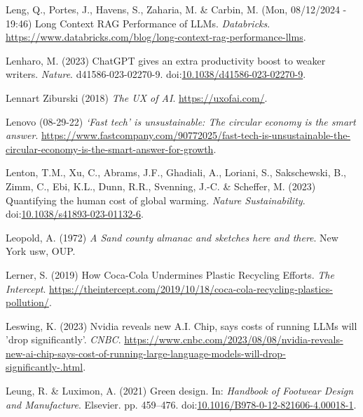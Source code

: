 \documentclass[
  letterpaper,
  DIV=11,
  numbers=noendperiod]{scrartcl}
\newlength{\cslhangindent}
\newenvironment{CSLReferences}[2] %
 {\begin{list}{}{%
  \setlength{\itemindent}{0pt}
  \setlength{\leftmargin}{0pt}
  \setlength{\parsep}{0pt}
  \ifodd #1
   \setlength{\leftmargin}{\cslhangindent}
   \setlength{\itemindent}{-1\cslhangindent}
  \fi
  \setlength{\itemsep}{#2\baselineskip}}}
 {\end{list}}
\begin{document}
\begin{CSLReferences}{0}{1}
Leng, Q., Portes, J., Havens, S., Zaharia, M. \& Carbin, M. (Mon,
08/12/2024 - 19:46) Long {Context RAG Performance} of {LLMs}.
\emph{Databricks}.
\url{https://www.databricks.com/blog/long-context-rag-performance-llms}.

Lenharo, M. (2023) {ChatGPT} gives an extra productivity boost to weaker
writers. \emph{Nature}. d41586-023-02270-9.
doi:\href{https://doi.org/10.1038/d41586-023-02270-9}{10.1038/d41586-023-02270-9}.

Lennart Ziburski (2018) \emph{The {UX} of {AI}}.
\url{https://uxofai.com/}.

Lenovo (08-29-22) \emph{{`{Fast} tech'} is unsustainable: {The} circular
economy is the smart answer}.
\url{https://www.fastcompany.com/90772025/fast-tech-is-unsustainable-the-circular-economy-is-the-smart-answer-for-growth}.

Lenton, T.M., Xu, C., Abrams, J.F., Ghadiali, A., Loriani, S.,
Sakschewski, B., Zimm, C., Ebi, K.L., Dunn, R.R., Svenning, J.-C. \&
Scheffer, M. (2023) Quantifying the human cost of global warming.
\emph{Nature Sustainability}.
doi:\href{https://doi.org/10.1038/s41893-023-01132-6}{10.1038/s41893-023-01132-6}.

Leopold, A. (1972) \emph{A {Sand} county almanac and sketches here and
there}. New York usw, OUP.

Lerner, S. (2019) How {Coca-Cola Undermines Plastic Recycling Efforts}.
\emph{The Intercept}.
\url{https://theintercept.com/2019/10/18/coca-cola-recycling-plastics-pollution/}.

Leswing, K. (2023) Nvidia reveals new {A}.{I}. Chip, says costs of
running {LLMs} will 'drop significantly'. \emph{CNBC}.
\url{https://www.cnbc.com/2023/08/08/nvidia-reveals-new-ai-chip-says-cost-of-running-large-language-models-will-drop-significantly-.html}.

Leung, R. \& Luximon, A. (2021) Green design. In: \emph{Handbook of
{Footwear Design} and {Manufacture}}. Elsevier. pp. 459--476.
doi:\href{https://doi.org/10.1016/B978-0-12-821606-4.00018-1}{10.1016/B978-0-12-821606-4.00018-1}.


\end{CSLReferences}
\end{document}
